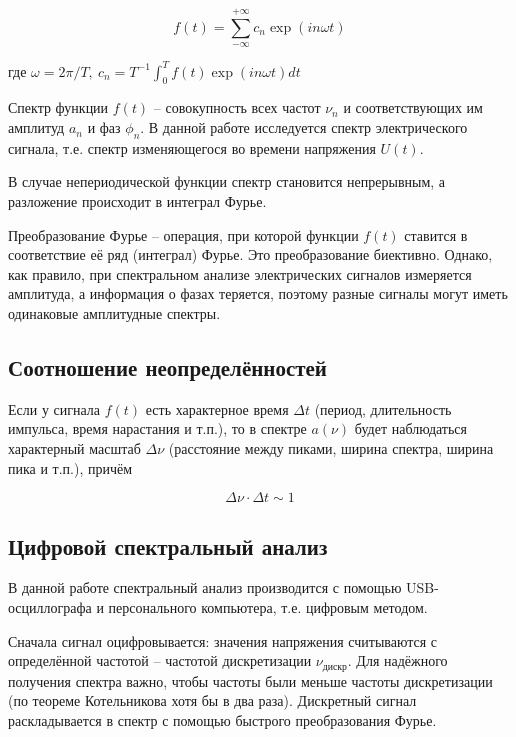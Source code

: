 \documentclass{article}
\begin{document}
		\begin{equation}
			f(t) = \sum_{-\infty}^{+\infty} c_n \exp(in\omega t)
		\end{equation}
		
		где $\omega = 2\pi/T, \ c_n = T^{-1}\int_0^Tf(t) \exp(in\omega t)dt $
		
		Спектр функции $f(t)$ -- совокупность всех частот $\nu_n$ и соответствующих им амплитуд $a_n$ и фаз $\phi_n$. В данной работе исследуется спектр электрического сигнала, т.е. спектр изменяющегося во времени напряжения $U(t)$.
		
		В случае непериодической функции спектр становится непрерывным, а разложение происходит в интеграл Фурье. 
		

		
		
		
		Преобразование Фурье -- операция, при которой функции $f(t)$ ставится в соответствие её ряд (интеграл) Фурье. Это преобразование биективно. Однако, как правило, при спектральном анализе электрических сигналов измеряется амплитуда, а информация о фазах теряется, поэтому разные сигналы могут иметь одинаковые амплитудные спектры.
	
	\subsection {Соотношение неопределённостей}
	
		\hspace{4mm} Если у сигнала $f(t)$ есть характерное время $\Delta t$ (период, длительность импульса, время нарастания и т.п.), то в спектре $a(\nu)$ будет наблюдаться характерный масштаб $\Delta \nu$ (расстояние между пиками, ширина спектра, ширина пика и т.п.), причём
		
		\begin{equation}
			\Delta \nu \cdot \Delta t \sim 1
		\end{equation}
	
	\subsection{Цифровой спектральный анализ}
	
		\hspace{4mm} В данной работе спектральный анализ производится с помощью USB-осциллографа и персонального компьютера, т.е. цифровым методом.
		
		Сначала сигнал оцифровывается: значения напряжения считываются с определённой частотой -- частотой дискретизации $\nu_{дискр}$. Для надёжного получения спектра важно, чтобы частоты были меньше частоты дискретизации (по теореме Котельникова хотя бы в два раза). Дискретный сигнал раскладывается в спектр с помощью быстрого преобразования Фурье.
		
\end{document}
